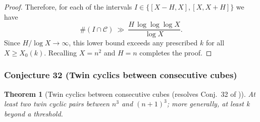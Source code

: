 \documentclass[12pt]{article}
\newtheorem{theorem}{Theorem}
\theoremstyle{remark}
\begin{document}
\begin{proof}
Therefore, for each of the intervals $I\in\{[X-H,X],[X,X+H]\}$ we have
$$
\#(I\cap\mathcal C)\ \gg\ \frac{H\,\log\log\log X}{\log X}.
$$
Since $H/\log X\to\infty$, this lower bound exceeds any prescribed $k$ for all $X\ge X_0(k)$. Recalling $X=n^2$ and $H=n$ completes the proof.
\end{proof}


\subsubsection{Conjecture 32 (Twin cyclics between consecutive cubes)}
\begin{theorem}[Twin cyclics between consecutive cubes (resolves Conj.~32 of \cite{Cohen2025})]\label{thm:twin_cyclics_between_consecutive_cubes}
At least two twin cyclic pairs between \(n^3\) and \((n+1)^3\); more generally, at least k beyond a threshold.
\end{theorem}
\end{document}
